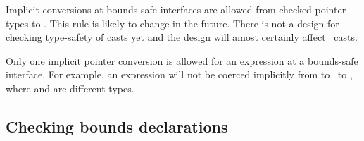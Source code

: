 Implicit conversions at bounds-safe interfaces are allowed from checked pointer types to
\uncheckedptrvoid.  This rule is likely to change in the future.  There is not a  design for
checking type-safety of casts yet and the design will amost certainly affect 
\uncheckedptrvoid\ casts.

Only one implicit pointer conversion is allowed for an expression at a bounds-safe
interface.  For example, an expression will not be
coerced implicitly from  to \uncheckedptrvoid\ to
, where  and  are different types.

\subsection{Checking bounds declarations}
\label{section:checking-bounds-interfaces}

